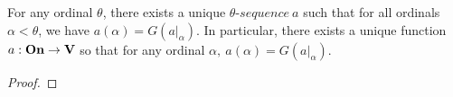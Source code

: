 \begin{theorem}
  \label{Ordinal_Transfinite_Recursion}
  For any ordinal $\theta$, there exists a unique $\theta \mbox{-} sequence \ a$ such that for all ordinals $\alpha < \theta$, we have $a(\alpha) = G(a|_{\alpha})$. In particular, there exists a unique function $a: \boldsymbol{\mathrm{On}} \to \boldsymbol{\mathrm{V}}$ so that for any ordinal $\alpha, \ a(\alpha) = G(a|_{\alpha})$.
\end{theorem}

\begin{proof}


\end{proof}
